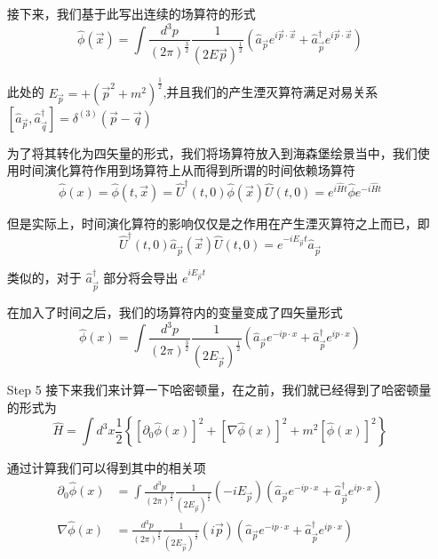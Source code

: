 \documentclass{article}
\begin{document}
\begin{itemize}
    接下来，我们基于此写出连续的场算符的形式
    \begin{equation*}
        \hat{\phi}(\vec{x}) = \int \frac{d^3p}{(2\pi)^{\frac{3}{2}}}\frac{1}{(2E_{}\vec{p})^\frac{1}{2}}\left(\hat{a}_{\vec{p}}e^{i\vec{p}\cdot \vec{x}} + \hat{a}_{\vec{p}}^\dagger e^{i\vec{p}\cdot\vec{x}}\right)
    \end{equation*}

    此处的 $E_{\vec{p}} = +\left(\vec{p}^2 + m^2\right)^{\frac{1}{2}}$,并且我们的产生湮灭算符满足对易关系 $\left[\hat{a}_{\vec{p}},\hat{a}_{\vec{q}}^\dagger\right] = \delta^{(3)}(\vec{p}-\vec{q})$ 

    为了将其转化为四矢量的形式，我们将场算符放入到海森堡绘景当中，我们使用时间演化算符作用到场算符上从而得到所谓的时间依赖场算符
    \begin{equation*}
        \hat{\phi}(x) = \hat{\phi}(t,\vec{x}) = \hat{U}^\dagger (t,0)\hat{\phi}(\vec{x})\hat{U}(t,0) = e^{i\hat{H}t}\hat{\phi}e^{-i\hat{H}t}
    \end{equation*}

    但是实际上，时间演化算符的影响仅仅是之作用在产生湮灭算符之上而已，即 
    \begin{equation*}
        \hat{U}^\dagger (t,0)\hat{a}_{\vec{p}}(\vec{x})\hat{U}(t,0) = e^{-iE_{\vec{p}}t}\hat{a}_{\vec{p}}
    \end{equation*}

    类似的，对于 $\hat{a}_{\vec{p}}^\dagger$ 部分将会导出 $e^{iE_{\vec{p}}t}$

    在加入了时间之后，我们的场算符内的变量变成了四矢量形式
    \begin{equation*}
        \hat{\phi}(x) = \int \frac{d^3p}{\left(2\pi\right)^{\frac{3}{2}}}\frac{1}{\left(2E_{\vec{p}}\right)^{\frac{1}{2}}}\left(\hat{a}_{\vec{p}}e^{-ip\cdot x} + \hat{a}_{\vec{p}}^\dagger e^{ip\cdot x}\right)
    \end{equation*}

    \item[Step 5] 接下来我们来计算一下哈密顿量，在之前，我们就已经得到了哈密顿量的形式为
    \begin{equation*}
        \hat{H} = \int d^3x\frac{1}{2}\left\{\left[\partial_0 \hat{\phi}(x)\right]^2 + \left[\nabla\hat{\phi}(x)\right]^2 +m^2 \left[\hat{\phi}(x)\right]^2\right\}
    \end{equation*}

    通过计算我们可以得到其中的相关项
    \begin{align*}
        \partial_0\hat{\phi}(x) &= \int \frac{d^3p}{\left(2\pi\right)^{\frac{3}{2}}}\frac{1}{\left(2E_{\vec{p}}\right)^{\frac{1}{2}}}\left(-iE_{\vec{p}}\right)\left(\hat{a}_{\vec{p}}e^{-ip\cdot x} + \hat{a}_{\vec{p}}^\dagger e^{ip\cdot x}\right) \\
        \nabla \hat{\phi}(x) &= \frac{d^3p}{\left(2\pi\right)^{\frac{3}{2}}}\frac{1}{\left(2E_{\vec{p}}\right)^{\frac{1}{2}}}\left(i\vec{p}\right)\left(\hat{a}_{\vec{p}}e^{-ip\cdot x} + \hat{a}_{\vec{p}}^\dagger e^{ip\cdot x}\right)
    \end{align*}


\end{itemize}
\end{document}
